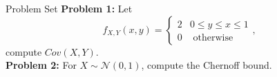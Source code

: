 \documentclass [aspectratio=169]{beamer}
\begin{document}
\begin{frame}{Problem Set}
    \textbf{Problem 1:}  Let
    $$f_{X, Y}(x, y)= \begin{cases}2 & 0 \leq y \leq x \leq 1 \\ 0 & \text { otherwise }\end{cases},
    $$
    compute $Cov(X, Y)$.\\
    \vspace{0.1in}
     \textbf{Problem 2:} For $X \sim \mathcal{N}(0,1)$, compute the Chernoff bound.
    \vspace{0.1in}\\
\end{frame}
\end{document}
